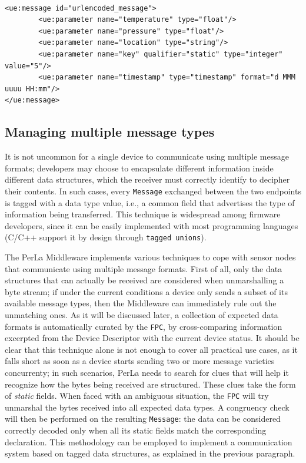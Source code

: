 \lstset{language=XML}
\begin{lstlisting}[float,floatplacement=!hbt,caption={An URLEncoded message
declaration. Thanks to the custom \texttt{URLEncodedMessageDescriptor}, trying
to create a non-primitive field results in an exception. Note the custom
\texttt{format} attribute on the timestamp field, which is employed to define
the encoding format for dates and times},label={lst:urlencodedmessage}]

<ue:message id="urlencoded_message">
        <ue:parameter name="temperature" type="float"/>
        <ue:parameter name="pressure" type="float"/>
        <ue:parameter name="location" type="string"/>
        <ue:parameter name="key" qualifier="static" type="integer" value="5"/>
        <ue:parameter name="timestamp" type="timestamp" format="d MMM uuuu HH:mm"/>
</ue:message>

\end{lstlisting}


\subsection{Managing multiple message types}

It is not uncommon for a single device to communicate using multiple message
formats; developers may choose to encapsulate different information inside
different data structures, which the receiver must correctly identify to
decipher their contents. In such cases, every \texttt{Message} exchanged
between the two endpoints is tagged with a data type value, i.e., a common
field that advertises the type of information being transferred. This technique
is widespread among firmware developers, since it can be easily implemented
with most programming languages (C/C++ support it by design through
\texttt{tagged unions}).

The PerLa Middleware implements various techniques to cope with sensor nodes
that communicate using multiple message formats. First of all, only the data
structures that can actually be received are considered when unmarshalling a
byte stream; if under the current conditions a device only sends a subset of
its available message types, then the Middleware can immediately rule out the
unmatching ones. As it will be discussed later, a collection of expected data
formats is automatically curated by the \texttt{FPC}, by cross-comparing
information excerpted from the Device Descriptor with the current device
status. It should be clear that this technique alone is not enough to cover all
practical use cases, as it falls short as soon as a device starts sending two
or more message varieties concurrenty; in such scenarios, PerLa needs to search
for clues that will help it recognize how the bytes being received are
structured. These clues take the form of \textit{static} fields. When faced
with an ambiguous situation, the \texttt{FPC} will try unmarshal the bytes
received into all expected data types. A congruency check will then be
performed on the resulting \texttt{Message}: the data can be considered
correctly decoded only when all its static fields match the corresponding
declaration. This methodology can be employed to implement a communication
system based on tagged data structures, as explained in the previous paragraph.


